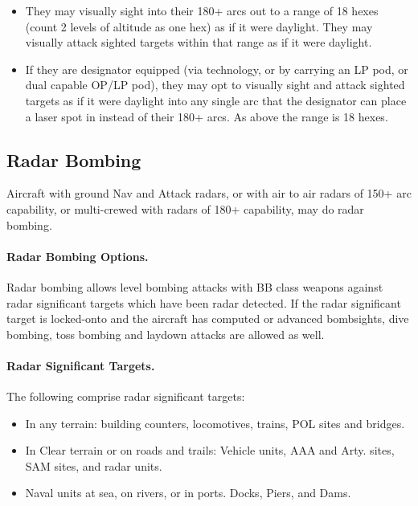 \begin{advancedrules}
\begin{itemize}
    \item They may visually sight into their 180+ arcs out to a range of 18 hexes (count 2 levels of altitude as one hex) as if it were daylight. They may visually attack sighted targets within that range as if it were daylight.

    \item If they are designator equipped (via technology, or by carrying an LP pod, or dual capable OP/LP pod), they may opt to visually sight and attack sighted targets as if it were daylight into any single arc that the designator can place a laser spot in instead of their 180+ arcs. As above the range is 18 hexes.

\end{itemize}

\subsection{Radar Bombing}

Aircraft with ground Nav and Attack radars, or with air to air radars of 150+ arc capability, or multi-crewed with radars of 180+ capability, may do radar bombing.

\paragraph{Radar Bombing Options.} Radar bombing allows level bombing attacks with BB class weapons against radar significant targets which have been radar detected. If the radar significant target is locked-onto and the aircraft has computed or advanced bombsights, dive bombing, toss bombing and laydown attacks are allowed as well.

\paragraph{Radar Significant Targets.} The following comprise radar significant targets:

\begin{itemize}

    \item In any terrain: building counters, locomotives, trains, POL sites and bridges.

    \item In Clear terrain or on roads and trails: Vehicle units, AAA and Arty. sites, SAM sites, and radar units.

    \item Naval units at sea, on rivers, or in ports. Docks, Piers, and Dams.


\end{itemize}
\end{advancedrules}
